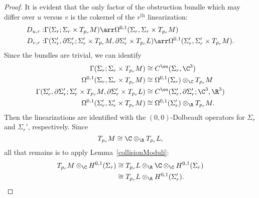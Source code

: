 \begin{proposition}
\begin{proof}
It is evident that the only factor of the obstruction bundle which may differ over $u$ versus $v$ is the cokernel of the $r^{\text{th}}$ linearization:
\begin{align*}
D_{u,r}: & \Gamma(\Sigma_r;\Sigma_r \times T_{p_r}M) \arr \Omega^{0,1}(\Sigma_r,\Sigma_r \times T_{p_r}M)
\\
D_{v,r}: & \Gamma(\Sigma_r',\partial\Sigma_r';\Sigma_r' \times T_{p_r}M,\partial\Sigma_r' \times T_{p_r}L) \arr \Omega^{0,1}(\Sigma_r',\Sigma_r' \times T_{p_r}M).
\end{align*}
Since the bundles are trivial, we can identify
\begin{align*}
\Gamma(\Sigma_r;\Sigma_r \times T_{p_r}M) & \cong C^\oo(\Sigma_r, \C^3)
\\
\Omega^{0,1}(\Sigma_r,\Sigma_r \times T_{p_r}M) & \cong \Omega^{0,1}(\Sigma_r) \otimes_\C T_{p_r}M
\\
\Gamma(\Sigma_r',\partial\Sigma_r';\Sigma_r' \times T_{p_r}M,\partial\Sigma_r' \times T_{p_r}L) & \cong C^\oo(\Sigma_r',\partial\Sigma_r'; \C^3,\R^3)
\\
\Omega^{0,1}(\Sigma_r',\Sigma_r' \times T_{p_r}M) & \cong \Omega^{0,1}(\Sigma_r') \otimes_\R T_{p_r}M.
\end{align*}
Then the linearizations are identified with the $(0,0)$-Dolbeault operators for $\Sigma_r$ and $\Sigma_r'$, respectively. Since
\[
T_{p_r}M \cong \C \otimes_\R T_{p_r}L,
\]
all that remains is to apply Lemma~\ref{collisionModuli}:
\begin{align*}
T_{p_r}M \otimes_\C H^{0,1}(\Sigma_r) & \cong T_{p_r}L \otimes_\R \C \otimes_\C H^{0,1}(\Sigma_r)
\\
& \cong T_{p_r}L \otimes_\R H^{0,1}(\Sigma_r').
\end{align*}
\end{proof}
\end{proposition}

